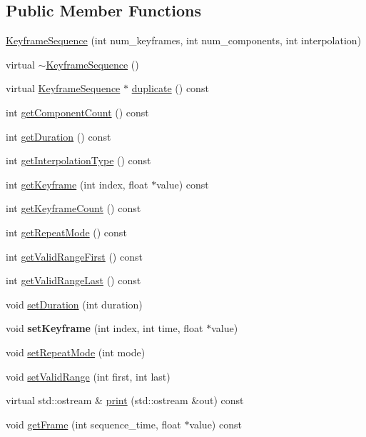 \subsection*{Public Member Functions}
\begin{CompactItemize}
\item 
\hyperlink{classm3g_1_1KeyframeSequence_f48cc8113ad7300d72840b18529aaf0e}{KeyframeSequence} (int num\_\-keyframes, int num\_\-components, int interpolation)
\item 
virtual \hyperlink{classm3g_1_1KeyframeSequence_464f5929e3302c788ca626c11ca8d656}{$\sim$KeyframeSequence} ()
\item 
virtual \hyperlink{classm3g_1_1KeyframeSequence}{KeyframeSequence} $\ast$ \hyperlink{classm3g_1_1KeyframeSequence_f925b7c3107b6cdba08dbb045b203b4f}{duplicate} () const 
\item 
int \hyperlink{classm3g_1_1KeyframeSequence_7016f51d2788e78fdd736efd040f5e5e}{getComponentCount} () const 
\item 
int \hyperlink{classm3g_1_1KeyframeSequence_995a5ca5c8c3c993ef167f67cbb5fabe}{getDuration} () const 
\item 
int \hyperlink{classm3g_1_1KeyframeSequence_0d46321e7f46e037508cce88cdf6a487}{getInterpolationType} () const 
\item 
int \hyperlink{classm3g_1_1KeyframeSequence_0fd27047149eedab8b10319768e1fe9a}{getKeyframe} (int index, float $\ast$value) const 
\item 
int \hyperlink{classm3g_1_1KeyframeSequence_4d500a603f25adafd8e6f8b68872dbff}{getKeyframeCount} () const 
\item 
int \hyperlink{classm3g_1_1KeyframeSequence_a356af60b9759d5d3da833773e3c7b73}{getRepeatMode} () const 
\item 
int \hyperlink{classm3g_1_1KeyframeSequence_b7e54386674cefdb8f5fa65ce5435b50}{getValidRangeFirst} () const 
\item 
int \hyperlink{classm3g_1_1KeyframeSequence_aa98cc8d698c482c33a3487c33db27d0}{getValidRangeLast} () const 
\item 
void \hyperlink{classm3g_1_1KeyframeSequence_d7406d5e0e2f398e05e3563d099dfdf1}{setDuration} (int duration)
\item 
\hypertarget{classm3g_1_1KeyframeSequence_700d02a4ac28514016721e4b1d2bcf96}{
void \textbf{setKeyframe} (int index, int time, float $\ast$value)}
\label{classm3g_1_1KeyframeSequence_700d02a4ac28514016721e4b1d2bcf96}

\item 
void \hyperlink{classm3g_1_1KeyframeSequence_e5cd1486fe0a8a61cf96816e976d7f87}{setRepeatMode} (int mode)
\item 
void \hyperlink{classm3g_1_1KeyframeSequence_b5a824131cef547816366141afe0339a}{setValidRange} (int first, int last)
\item 
virtual std::ostream \& \hyperlink{classm3g_1_1KeyframeSequence_6fea17fa1532df3794f8cb39cb4f911f}{print} (std::ostream \&out) const 
\item 
void \hyperlink{classm3g_1_1KeyframeSequence_89be810f096d4f4f6028ca556c7f5f05}{getFrame} (int sequence\_\-time, float $\ast$value) const 
\end{CompactItemize}
